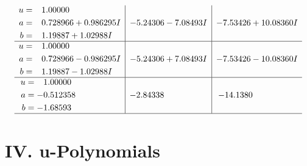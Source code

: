 \documentclass[1p]{elsarticle_modified}
\theoremstyle{definition}
\begin{document}
$$\begin{array}{c|c|c}
\begin{aligned}
u &= \phantom{-}1.00000\phantom{ +0.000000I} \\
a &= \phantom{-}0.728966 + 0.986295 I \\
b &= \phantom{-}1.19887 + 1.02988 I\end{aligned}
 & -5.24306 - 7.08493 I & -7.53426 + 10.08360 I \\ \hline\begin{aligned}
u &= \phantom{-}1.00000\phantom{ +0.000000I} \\
a &= \phantom{-}0.728966 - 0.986295 I \\
b &= \phantom{-}1.19887 - 1.02988 I\end{aligned}
 & -5.24306 + 7.08493 I & -7.53426 - 10.08360 I \\ \hline\begin{aligned}
u &= \phantom{-}1.00000\phantom{ +0.000000I} \\
a &= -0.512358\phantom{ +0.000000I} \\
b &= -1.68593\phantom{ +0.000000I}\end{aligned}
 & -2.84338\phantom{ +0.000000I} & -14.1380\phantom{ +0.000000I}\\
 \hline 
 \end{array}$$\newpage
\newpage\renewcommand{\arraystretch}{1}
\centering \section*{ IV. u-Polynomials}
\end{document}

